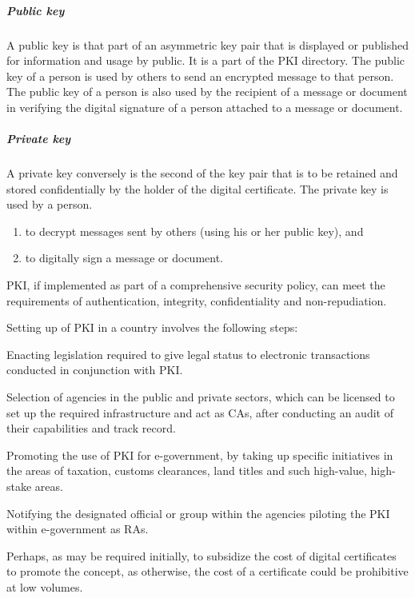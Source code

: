 \subparagraph*{Public key}
A public key is that part of an asymmetric key pair that is displayed or published
for information and usage by public. It is a part of the PKI directory. The public key of a person is used by others to send an encrypted message
to that person. The public key of a person is also used by the recipient of a
message or document in verifying the digital signature of a person attached to a
message or document.


\subparagraph*{Private key}
A private key conversely is the second of the key pair that is to be retained and
stored confidentially by the holder of the digital certificate. The private key is
used by a person.
\begin{enumerate}[label=(\alph*)]
	\item to decrypt messages sent by others (using his or her public key), and
	\item to digitally sign a message or document.\\
\end{enumerate}
 
PKI, if implemented as part of a comprehensive security policy, can meet the
requirements of authentication, integrity, confidentiality and non-repudiation.

Setting up of PKI in a country involves the following steps:

\begin{steps}
	\item Enacting legislation required to give legal status to electronic transactions
	conducted in conjunction with PKI.
	
	\item Selection of agencies in the public and private sectors, which can be licensed to
	set up the required infrastructure and act as CAs, after conducting an audit of their
	capabilities and track record.
	
	\item Promoting the use of PKI for e-government, by taking up specific initiatives in the areas of taxation, customs clearances, land titles and such high-value, high-stake areas.
	
	\item Notifying the designated official or group within the agencies piloting the PKI
	within e-government as RAs.
	
	\item Perhaps, as may be required initially, to subsidize the cost of digital certificates
	to promote the concept, as otherwise, the cost of a certificate could be prohibitive
	at low volumes.
\end{steps}


